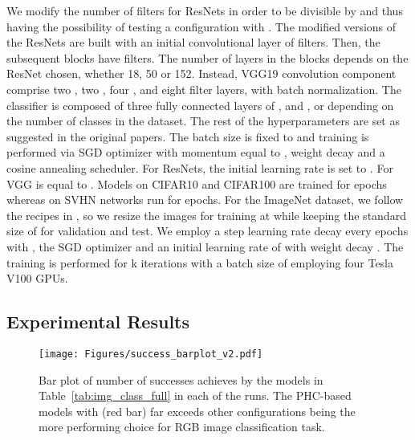 \documentclass[lettersize,journal]{IEEEtran}
\begin{document}
We modify the number of filters for ResNets in order to be divisible by  and thus having the possibility of testing a configuration with . The modified versions of the ResNets are built with an initial convolutional layer of  filters. Then, the subsequent blocks have  filters. The number of layers in the blocks depends on the ResNet chosen, whether 18, 50 or 152. Instead, VGG19 convolution component comprise two , two , four , and eight  filter layers, with batch normalization. The classifier is composed of three fully connected layers of ,  and ,  or  depending on the number of classes in the dataset. The rest of the hyperparameters are set as suggested in the original papers.
The batch size is fixed to  and training is performed via SGD optimizer with momentum equal to , weight decay  and a cosine annealing scheduler. For ResNets, the initial learning rate is set to . For VGG is equal to . Models on CIFAR10 and CIFAR100 are trained for  epochs whereas on SVHN networks run for  epochs. For the ImageNet dataset, we follow the recipes in \cite{wightman2021resnet}, so we resize the images for training at  while keeping the standard size of  for validation and test. We employ a step learning rate decay every  epochs with , the SGD optimizer and an initial learning rate of  with weight decay . The training is performed for k iterations with a batch size of  employing four Tesla V100 GPUs.

\subsection{Experimental Results}
\begin{figure}[t]
    \centering
    \texttt{[image: Figures/success\_barplot\_v2.pdf]}
    \caption{Bar plot of number of successes achieves by the models in Table~\ref{tab:img_class_full} in each of the runs. The PHC-based models with  (red bar) far exceeds other configurations being the more performing choice for RGB image classification task.}
    \label{fig:barplot}
\end{figure}
\end{document}
